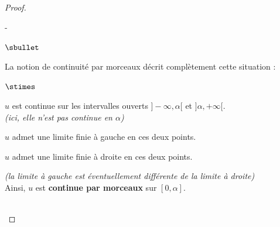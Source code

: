 \begin{proof}
\begin{remarkL}{.97}
\begin{noliste}{-}
\begin{noliste}{$\sbullet$}
        \item La notion de continuité par morceaux décrit 
	complètement cette situation :
	\end{noliste}
          \begin{liste}{$\stimes$}
          \item $u$ est continue sur les intervalles ouverts
            $]-\infty, \alpha[$ et $]\alpha, +\infty[$. \\
	    {\it(ici, elle n'est pas continue en $\alpha$)}
          \item $u$ admet une limite finie à gauche en ces deux
            points.
          \item $u$ admet une limite finie à droite en ces deux
            points.
          \end{liste}
          {\it (la limite à gauche est éventuellement différente de la
            limite à droite)}\\
          Ainsi, $u$ est {\bf continue par morceaux} sur $[0,\alpha]$.
      \end{noliste}
      \end{remarkL}~\\[-1.4cm]

\end{proof}
